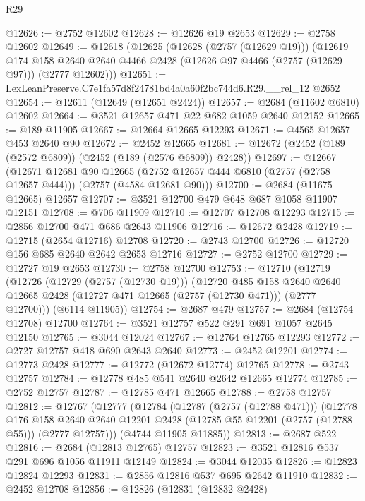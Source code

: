 \begin{lexlean}{R29}
\begin{coremodule}
@12626 := @2752 @12602
@12628 := @12626 @19 @2653
@12629 := @2758 @12602
@12649 := @12618
    (@12625
      (@12628 (@2757 (@12629 @19)))
      (@12619
        @174
        @158
        @2640
        @2640
        @4466
        @2428
        (@12626 @97 @4466 (@2757 (@12629 @97)))
        (@2777 @12602)))
@12651 := LexLeanPreserve.C7e1fa57d8f24781bd4a0a60f2bc744d6.R29.__rel_12 @2652
@12654 := @12611 (@12649 (@12651 @2424))
@12657 := @2684 (@11602 @6810) @12602
@12664 := @3521 @12657 @471 @22 @682 @1059 @2640 @12152
@12665 := @189 @11905
@12667 := @12664 @12665 @12293
@12671 := @4565 @12657 @453 @2640 @90
@12672 := @2452 @12665
@12681 := @12672 (@2452 (@189 (@2572 @6809)) (@2452 (@189 (@2576 @6809)) @2428))
@12697 := @12667
    (@12671
      @12681
      @90
      @12665
      (@2752 @12657 @444 @6810 (@2757 (@2758 @12657 @444)))
      (@2757 (@4584 @12681 @90)))
@12700 := @2684 (@11675 @12665) @12657
@12707 := @3521 @12700 @479 @648 @687 @1058 @11907 @12151
@12708 := @706 @11909
@12710 := @12707 @12708 @12293
@12715 := @2856 @12700 @471 @686 @2643 @11906
@12716 := @12672 @2428
@12719 := @12715 (@2654 @12716) @12708
@12720 := @2743 @12700
@12726 := @12720 @156 @685 @2640 @2642 @2653 @12716
@12727 := @2752 @12700
@12729 := @12727 @19 @2653
@12730 := @2758 @12700
@12753 := @12710
    (@12719
      (@12726
        (@12729 (@2757 (@12730 @19)))
        (@12720
          @485
          @158
          @2640
          @2640
          @12665
          @2428
          (@12727 @471 @12665 (@2757 (@12730 @471)))
          (@2777 @12700)))
      (@6114 @11905))
@12754 := @2687 @479
@12757 := @2684 (@12754 @12708) @12700
@12764 := @3521 @12757 @522 @291 @691 @1057 @2645 @12150
@12765 := @3044 @12024
@12767 := @12764 @12765 @12293
@12772 := @2727 @12757 @418 @690 @2643 @2640
@12773 := @2452 @12201
@12774 := @12773 @2428
@12777 := @12772 (@12672 @12774) @12765
@12778 := @2743 @12757
@12784 := @12778 @485 @541 @2640 @2642 @12665 @12774
@12785 := @2752 @12757
@12787 := @12785 @471 @12665
@12788 := @2758 @12757
@12812 := @12767
    (@12777
      (@12784
        (@12787 (@2757 (@12788 @471)))
        (@12778
          @176
          @158
          @2640
          @2640
          @12201
          @2428
          (@12785 @55 @12201 (@2757 (@12788 @55)))
          (@2777 @12757)))
      (@4744 @11905 @11885))
@12813 := @2687 @522
@12816 := @2684 (@12813 @12765) @12757
@12823 := @3521 @12816 @537 @291 @696 @1056 @11911 @12149
@12824 := @3044 @12035
@12826 := @12823 @12824 @12293
@12831 := @2856 @12816 @537 @695 @2642 @11910
@12832 := @2452 @12708
@12856 := @12826
    (@12831
      (@12832 @2428)

\end{coremodule}
\end{lexlean}
